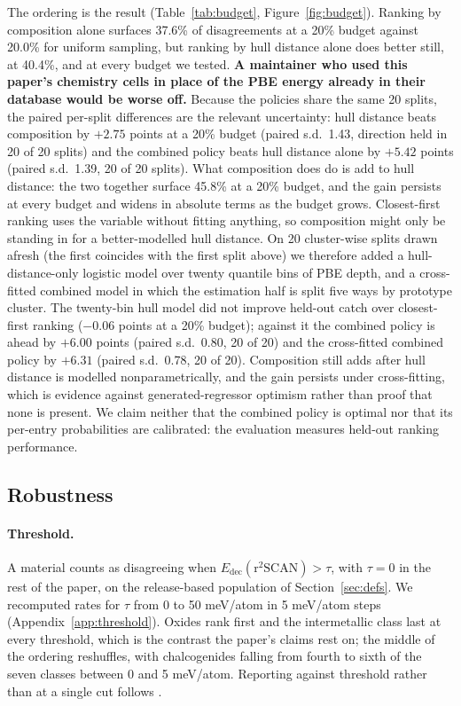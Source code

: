\documentclass[11pt]{article}
\begin{document}
The ordering is the result (Table~\ref{tab:budget}, Figure~\ref{fig:budget}). Ranking
by composition alone surfaces 37.6\% of disagreements at a 20\% budget against 20.0\%
for uniform sampling, but ranking by hull
distance alone does better still, at 40.4\%, and at every budget we tested. \textbf{A
maintainer who used this paper's chemistry cells in place of the PBE energy already in
their database would be worse off.} Because the policies share the same 20 splits, the
paired per-split differences are the relevant uncertainty: hull distance beats
composition by $+2.75$ points at a 20\% budget (paired s.d.\ 1.43, direction held in
20 of 20 splits) and the combined
policy beats hull distance alone by $+5.42$ points (paired s.d.\ 1.39, 20 of 20 splits). What
composition does do is add to hull distance: the two together surface 45.8\% at a 20\%
budget, and the gain persists at every budget and widens in absolute terms as the budget
grows. Closest-first ranking uses the variable without fitting anything, so composition might
only be standing in for a better-modelled hull distance. On 20 cluster-wise splits drawn afresh (the first coincides with the first split above) we therefore
added a hull-distance-only logistic model over twenty quantile bins of PBE depth, and a
cross-fitted combined model in which the estimation half is split five ways by prototype
cluster. The twenty-bin
hull model did not improve held-out catch over closest-first ranking ($-0.06$ points at
a 20\% budget); against it the combined policy is ahead by $+6.00$ points (paired s.d.\
0.80, 20 of 20) and the cross-fitted combined policy by $+6.31$ (paired s.d.\ 0.78, 20
of 20). Composition still adds after hull distance is modelled nonparametrically, and
the gain persists under cross-fitting, which is evidence against generated-regressor
optimism rather than proof that none is present. We claim neither that the combined
policy is optimal nor that its per-entry probabilities are calibrated: the evaluation
measures
held-out ranking performance.

\subsection{Robustness}\label{sec:robust}

\paragraph{Threshold.} A material counts as disagreeing when
$E_{\text{dec}}(\text{r}^2\text{SCAN}) > \tau$, with $\tau=0$ in the rest of the paper,
on the release-based population of Section~\ref{sec:defs}. We recomputed rates for $\tau$ from 0 to 50 meV/atom in 5 meV/atom steps
(Appendix~\ref{app:threshold}). Oxides rank first and the intermetallic class last at
every threshold, which is the contrast the paper's claims rest on; the middle of the
ordering reshuffles, with chalcogenides falling from fourth to sixth of the seven classes
between 0 and 5 meV/atom. Reporting against threshold rather than at a single cut follows
\citet{reents2026}.
\end{document}
